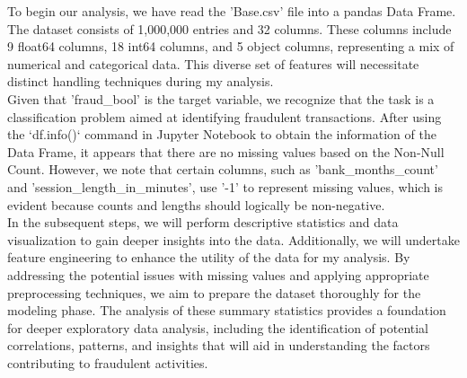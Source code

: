 \documentclass[12pt,a4paper]{report}
\begin{document}
To begin our analysis, we have read the 'Base.csv' file into a pandas Data Frame. The dataset consists of 1,000,000 entries and 32 columns. These columns include 9 float64 columns, 18 int64 columns, and 5 object columns, representing a mix of numerical and categorical data. This diverse set of features will necessitate distinct handling techniques during my analysis.\\

Given that 'fraud\_bool' is the target variable, we recognize that the task is a classification problem aimed at identifying fraudulent transactions. After using the `df.info()` command in Jupyter Notebook to obtain the information of the Data Frame, it appears that there are no missing values based on the Non-Null Count. However, we note that certain columns, such as 'bank\_months\_count' and 'session\_length\_in\_minutes', use '-1' to represent missing values, which is evident because counts and lengths should logically be non-negative.\\

In the subsequent steps, we will perform descriptive statistics and data visualization to gain deeper insights into the data. Additionally, we will undertake feature engineering to enhance the utility of the data for my analysis. By addressing the potential issues with missing values and applying appropriate preprocessing techniques, we aim to prepare the dataset thoroughly for the modeling phase. The analysis of these summary statistics provides a foundation for deeper exploratory data analysis, including the identification of potential correlations, patterns, and insights that will aid in understanding the factors contributing to fraudulent activities.\\
\end{document}
